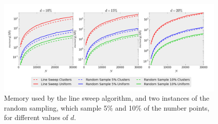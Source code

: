 \begin{figure}[!h] 
	\vspace{-10pt}
	\centering
	\includegraphics[width=\linewidth]{Pictures/ls_rs_s} 
	\caption[Memory used by Line Sweep and Random Sampling algorithms.]{Memory used by the line sweep algorithm, and two instances of the random sampling, which sample 5\% and 10\% of the number points, for different values of $d$.}
	\label{fig:ls_rs_s} 
\end{figure}